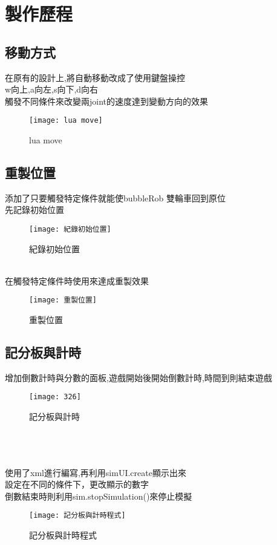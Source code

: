 \chapter{製作歷程}

\section{移動方式}
在原有的設計上,將自動移動改成了使用鍵盤操控\\
w向上,a向左,s向下,d向右\\
觸發不同條件來改變兩joint的速度達到變動方向的效果
\begin{figure}[hbt!]
\begin{center}
\texttt{[image: lua move]}
\caption{\Large lua move }\label{ lua move}
\end{center}
\end{figure} 
\section{重製位置}
添加了只要觸發特定條件就能使bubbleRob 雙輪車回到原位\\
先記錄初始位置
\begin{figure}[hbt!]
\begin{center}
\texttt{[image: 紀錄初始位置]}
\caption{\Large 紀錄初始位置 }\label{紀錄初始位置}
\end{center}
\end{figure} 
\qquad \\
在觸發特定條件時使用來達成重製效果
\begin{figure}[hbt!]
\begin{center}
\texttt{[image: 重製位置]}
\caption{\Large 重製位置 }\label{重製位置}
\end{center}
\end{figure} 
\section{記分板與計時}
增加倒數計時與分數的面板,遊戲開始後開始倒數計時,時間到則結束遊戲
\begin{figure}[hbt!]
\begin{center}
\texttt{[image: 326]}
\caption{\Large 記分板與計時 }\label{記分板與計時}
\end{center}
\end{figure} 
\qquad \\
\\
\\
使用了xml進行編寫,再利用simUI.create顯示出來\\
設定在不同的條件下，更改顯示的數字\\
倒數結束時則利用sim.stopSimulation()來停止模擬
\begin{figure}[hbt!]
\begin{center}
\texttt{[image: 記分板與計時程式]}
\caption{\Large 記分板與計時程式 }\label{記分板與計時程式}
\end{center}
\end{figure} 
\qquad \\
\\
